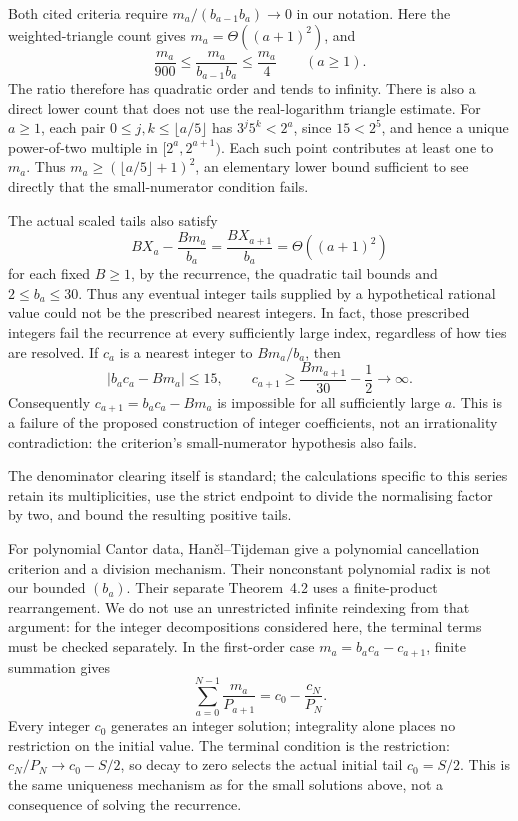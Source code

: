 Both cited criteria require $m_a/(b_{a-1}b_a)\to0$ in our notation.
Here the weighted-triangle count gives $m_a=\Theta((a+1)^2)$, and
\[
 \frac{m_a}{900}\le\frac{m_a}{b_{a-1}b_a}\le\frac{m_a}{4}
 \qquad(a\ge1).
\]
The ratio therefore has quadratic order and tends to infinity.
There is also a direct lower count that does not use the real-logarithm
triangle estimate.  For $a\ge1$, each pair
$0\le j,k\le\lfloor a/5\rfloor$ has $3^j5^k<2^a$, since $15<2^5$,
and hence a unique power-of-two multiple in $[2^a,2^{a+1})$.
Each such point contributes at least one to $m_a$.  Thus
$m_a\ge(\lfloor a/5\rfloor+1)^2$, an elementary lower bound sufficient
to see directly that the small-numerator condition fails.

The actual scaled tails also satisfy
\[
 BX_a-\frac{Bm_a}{b_a}=\frac{BX_{a+1}}{b_a}
 =\Theta((a+1)^2)
\]
for each fixed $B\ge1$, by the recurrence, the quadratic tail bounds and
$2\le b_a\le30$.  Thus any eventual integer tails supplied by a
hypothetical rational value could not be the prescribed nearest integers.
In fact, those prescribed integers fail the recurrence at every
sufficiently large index, regardless of how ties are resolved.  If $c_a$
is a nearest integer to $Bm_a/b_a$, then
\[
 |b_ac_a-Bm_a|\le15,\qquad
 c_{a+1}\ge\frac{Bm_{a+1}}{30}-\frac12\longrightarrow\infty.
\]
Consequently $c_{a+1}=b_ac_a-Bm_a$ is impossible for all sufficiently
large $a$.  This is a failure of the proposed construction of integer coefficients, not an irrationality
contradiction: the criterion's small-numerator hypothesis also fails.

The denominator clearing itself is standard; the calculations specific
to this series retain its multiplicities, use the strict endpoint to
divide the normalising factor by two, and bound the resulting positive tails.

For polynomial Cantor data, Han\v{c}l--Tijdeman
\cite[Theorems~2.2 and 3.1]{hancltijdeman2008} give a polynomial
cancellation criterion and a division mechanism.  Their nonconstant
polynomial radix is not our bounded $(b_a)$.  Their separate
Theorem~4.2 uses a finite-product rearrangement.  We do not use an
unrestricted infinite reindexing from that argument: for the integer
decompositions considered here, the terminal terms must be checked
separately.  In the first-order case
$m_a=b_ac_a-c_{a+1}$, finite summation gives
\[
 \sum_{a=0}^{N-1}\frac{m_a}{P_{a+1}}
 =c_0-\frac{c_N}{P_N}.
\]
Every integer $c_0$ generates an integer solution; integrality alone
places no restriction on the initial value. The terminal condition is the
restriction: $c_N/P_N\to c_0-S/2$, so decay to zero selects the actual
initial tail $c_0=S/2$. This is the same uniqueness mechanism as for the
small solutions above, not a consequence of solving the recurrence.

